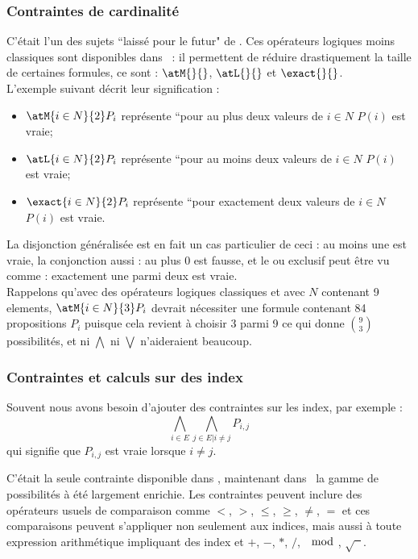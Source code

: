 \subsubsection*{Contraintes de cardinalit\'e}
C'\'etait l'un des sujets ``laiss\'e pour le futur" de \cite{GaScSt2011}.
Ces op\'erateurs logiques moins classiques sont disponibles dans \nameTool\ : il permettent de r\'eduire drastiquement la taille de certaines formules, ce sont : $\atM{}{}$, $\atL{}{}$ et $\exact{}{}$.\\ L'exemple suivant d\'ecrit leur signification :
\begin{itemize}
\item $\atM{i \in N}{2} P_i$ repr\'esente ``pour au plus deux valeurs de $i \in N$ $P(i)$ est vraie;
\item $\atL{i \in N}{2} P_i$ repr\'esente ``pour au moins deux valeurs de $i \in N$ $P(i)$ est vraie;
\item $\exact{i \in N}{2} P_i$ repr\'esente ``pour exactement deux valeurs de $i \in N$ $P(i)$ est vraie.
\end{itemize}
La disjonction g\'en\'eralis\'ee est en fait un cas particulier de ceci : au moins une est vraie, la conjonction aussi : au plus 0 est fausse, et le ou exclusif peut \^etre vu comme : exactement une parmi deux est vraie. \\
Rappelons qu'avec des op\'erateurs logiques classiques et avec $N$ contenant 9 elements, $\atM{i \in N}{3} P_i$ devrait n\'ecessiter une formule contenant 84 propositions $P_i$ puisque cela revient \`a choisir 3 parmi 9 ce qui donne $\binom{9}{3}$ possibilit\'es, et ni $\bigwedge$ ni $\bigvee$ n'aideraient beaucoup. 

\subsubsection*{Contraintes et calculs sur des index}

Souvent nous avons besoin d'ajouter des contraintes sur les index, par exemple :
$$\bigwedge_{i \in E } \bigwedge_{j \in E  | i \neq j}P_{i,j}$$
qui signifie que $P_{i,j}$ est vraie lorsque $i\neq j$. 

C'\'etait la seule contrainte disponible dans \satoulouse, maintenant dans \nameTool\ la gamme de possibilit\'es \`a \'et\'e largement enrichie. Les contraintes peuvent inclure des op\'erateurs usuels de comparaison comme $<$, $>$, $\leq$, $\geq$, $\neq$, $=$ et ces comparaisons peuvent s'appliquer non seulement aux indices, mais aussi \`a toute expression arithm\'etique impliquant des index et $+$, $-$, $*$, $/$, $\mod$, $\sqrt{\phantom{x}}$. 

